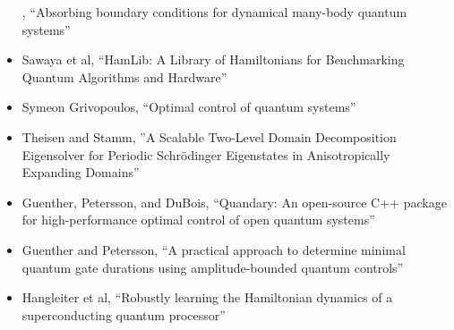 \documentclass[]{article}
\begin{document}
\begin{itemize}
\cite{Selsto2010},
``Absorbing boundary conditions for dynamical many-body quantum systems''
\item Sawaya et al\cite{10313872},
  ``HamLib: A Library of Hamiltonians for Benchmarking Quantum Algorithms and Hardware''
\item Symeon Grivopoulos\cite{grivopoulos2005optimal},
 ``Optimal control of quantum systems''
\item Theisen and Stamm\cite{doi:10.1137/23M161848X},
  ''A Scalable Two-Level Domain Decomposition Eigensolver for Periodic Schrödinger Eigenstates in Anisotropically Expanding Domains''
\item Guenther, Petersson, and DuBois\cite{9651392},
  ``Quandary: An open-source C++ package for high-performance optimal control of open quantum systems''
\item Guenther and Petersson\cite{gunther2023practical},
``A practical approach to determine minimal quantum gate durations using amplitude-bounded quantum controls''
\item Hangleiter et al\cite{hangleiter2024robustly},
``Robustly learning the Hamiltonian dynamics of a superconducting quantum processor''
\end{itemize}

\begin{comment}

Indicates the timeframe in which the special issue could be produced (to include paper writing, reviewing and submission of final copy to the journal) assuming the proposal is accepted;
Includes a short biography of all authors and guest editors;
Indicates any special timing, associated events, funding support, partnerships or other links or relationships which could influence the development of the issue;
Provides any further information which you feel is relevant.
A special issue normally contains between five and 20 full-length articles, in addition to an editorial written by the special issue organizers. Because it is highly unlikely that all articles submitted for potential inclusion in a special issue will successfully pass the peer review process, it is wise to consider more papers than you anticipate as the upper limit. If fewer than three articles are accepted for publication, the articles will be published as stand-alone articles in the journal.
Once you're ready, use the link below to find your chosen journal and submit your proposal.

https://www.elsevier.com/editor/role/guest/guide

\end{comment}
\end{document}
